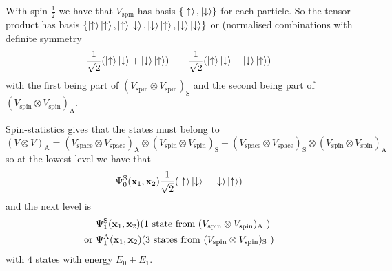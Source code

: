 \documentclass{article}
\begin{document}
With spin $ \frac 12 $ we have that $ V_{\mathrm{spin}} $ has basis $ \{\ket \uparrow, \ket \downarrow\} $ for each particle. So the tensor product has basis $ \{\ket \uparrow \ket \uparrow, \ket \uparrow \ket \downarrow, \ket \downarrow \ket \uparrow, \ket \downarrow\ket \downarrow\} $ or (normalised combinations with definite symmetry
\[
	\frac 1{\sqrt 2}(\ket \uparrow \ket\downarrow + \ket \downarrow\ket\uparrow)\qquad \frac 1{\sqrt 2}(\ket \uparrow \ket\downarrow - \ket \downarrow\ket\uparrow)
\]
with the first being part of $ (V_{\mathrm{spin}} \otimes V_{\mathrm{spin}})_{\mathrm S} $ and the second being part of $(V_{\mathrm{spin}} \otimes V_{\mathrm{spin}})_{\mathrm A} $.\par
Spin-statistics gives that the states must belong to
\[
	(V\otimes V)_{\mathrm A} =  (V_{\mathrm{space}} \otimes V_{\mathrm{space}})_{\mathrm A} \otimes  (V_{\mathrm{spin}} \otimes V_{\mathrm{spin}})_{\mathrm S} +  (V_{\mathrm{space}} \otimes V_{\mathrm{space}})_{\mathrm S} \otimes  (V_{\mathrm{spin}} \otimes V_{\mathrm{spin}})_{\mathrm A}
\]
so at the lowest level we have that
\[
	\Psi_0^{\mathrm S} (\mathbf{x}_1,\mathbf{x}_2) \frac 1{\sqrt 2} (\ket\uparrow\ket \downarrow - \ket \downarrow\ket \uparrow)
\]
and the next level is
\begin{align*}
	&\Psi^{\mathrm S}_1(\mathbf{x}_1,\mathbf{x}_2)(1 \text{ state from }  (V_{\mathrm{spin}} \otimes V_{\mathrm{spin}})_{\mathrm A}\ ) \\
	\text{or } & \Psi_1^{\mathrm A} (\mathbf{x}_1,\mathbf{x}_2)(3 \text{ states from }  (V_{\mathrm{spin}} \otimes V_{\mathrm{spin}})_{\mathrm S}\ )
\end{align*}
with $ 4 $ states with energy $ E_0 + E_1 $.
\end{document}
